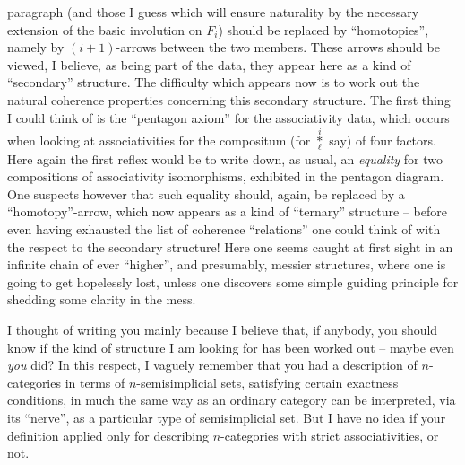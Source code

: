 paragraph (and those I guess which will ensure naturality by the
necessary extension of the basic involution on $F_i$) should be
replaced by ``homotopies'', namely by $(i+1)$-arrows between the two
members. These arrows should be viewed, I believe, as being part of
the data, they appear here as a kind of ``secondary'' structure. The
difficulty which appears now is to work out the natural coherence
properties concerning this secondary structure. The first thing I
could think of is the ``pentagon axiom'' for the associativity data,
which occurs when looking at associativities for the compositum (for
$\overset{i}{\underset{\ell}{*}}$ say) of four factors. Here again the
first reflex would be to write down, as usual, an \emph{equality} for
two compositions of associativity isomorphisms, exhibited in the
pentagon diagram. One suspects however that such equality should,
again, be replaced by a ``homotopy''-arrow, which now appears as a
kind of ``ternary'' structure -- before even having exhausted the list
of coherence ``relations'' one could think of with the respect to the
secondary structure! Here one seems caught at first sight in an
infinite chain of ever ``higher'', and presumably, messier structures,
where one is going to get hopelessly lost, unless one discovers some
simple guiding principle for shedding some clarity in the mess.

\label{sec:3}%
I thought of writing you mainly because I believe that,
if anybody, you should know if the kind of structure I am looking for
has been worked out -- maybe even \emph{you} did? In this respect, I
vaguely remember that you had a description of $n$-categories in terms
of $n$-semisimplicial sets, satisfying certain exactness conditions,
in much the same way as an ordinary category can be interpreted, via
its ``nerve'', as a particular type of semisimplicial set. But I have
no idea if your definition applied only for describing $n$-categories
with strict associativities, or not.

